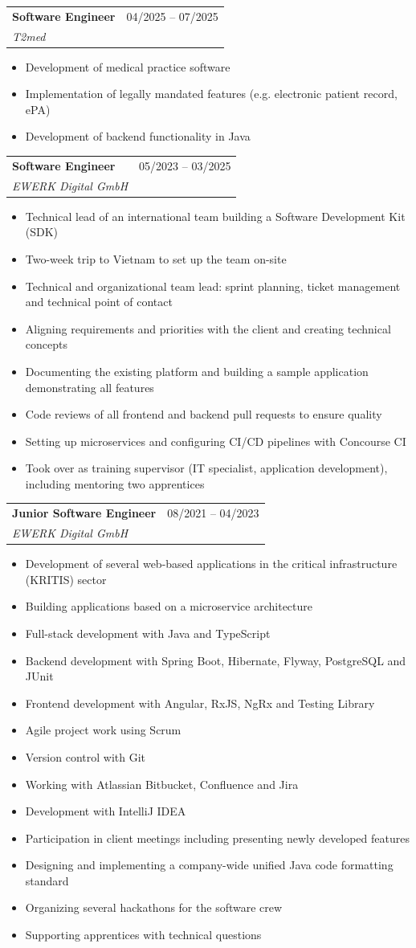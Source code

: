 \documentclass[a4paper,11pt]{article}
\makeatletter
\newcommand{\resumeItem}[1]{
  \item\small{
    {#1 \vspace{-2pt}}
  }
}
\newcommand{\resumeSubheading}[4]{
  \vspace{-2pt}\item
    \begin{tabular*}{0.97\textwidth}[t]{l@{\extracolsep{\fill}}r}
      \textbf{#1} & #2 \\
      \textit{\small#3} & \textit{\small #4} \\
    \end{tabular*}\vspace{-7pt}
}
\newcommand{\resumeItemListStart}{\begin{itemize}}
\newcommand{\resumeItemListEnd}{\end{itemize}\vspace{-5pt}}
\makeatother
\begin{document}
    \resumeSubheading
      {Software Engineer}{04/2025 -- 07/2025}
      {T2med}{}
      \resumeItemListStart
        \resumeItem{Development of medical practice software}
        \resumeItem{Implementation of legally mandated features (e.g. electronic patient record, ePA)}
        \resumeItem{Development of backend functionality in Java}
      \resumeItemListEnd

    \resumeSubheading
      {Software Engineer}{05/2023 -- 03/2025}
      {EWERK Digital GmbH}{}
      \resumeItemListStart
        \resumeItem{Technical lead of an international team building a Software Development Kit (SDK)}
        \resumeItem{Two-week trip to Vietnam to set up the team on-site}
        \resumeItem{Technical and organizational team lead: sprint planning, ticket management and technical point of contact}
        \resumeItem{Aligning requirements and priorities with the client and creating technical concepts}
        \resumeItem{Documenting the existing platform and building a sample application demonstrating all features}
        \resumeItem{Code reviews of all frontend and backend pull requests to ensure quality}
        \resumeItem{Setting up microservices and configuring CI/CD pipelines with Concourse CI}
        \resumeItem{Took over as training supervisor (IT specialist, application development), including mentoring two apprentices}
      \resumeItemListEnd

    \resumeSubheading
      {Junior Software Engineer}{08/2021 -- 04/2023}
      {EWERK Digital GmbH}{}
      \resumeItemListStart
        \resumeItem{Development of several web-based applications in the critical infrastructure (KRITIS) sector}
        \resumeItem{Building applications based on a microservice architecture}
        \resumeItem{Full-stack development with Java and TypeScript}
        \resumeItem{Backend development with Spring Boot, Hibernate, Flyway, PostgreSQL and JUnit}
        \resumeItem{Frontend development with Angular, RxJS, NgRx and Testing Library}
        \resumeItem{Agile project work using Scrum}
        \resumeItem{Version control with Git}
        \resumeItem{Working with Atlassian Bitbucket, Confluence and Jira}
        \resumeItem{Development with IntelliJ IDEA}
        \resumeItem{Participation in client meetings including presenting newly developed features}
        \resumeItem{Designing and implementing a company-wide unified Java code formatting standard}
        \resumeItem{Organizing several hackathons for the software crew}
        \resumeItem{Supporting apprentices with technical questions}
      \resumeItemListEnd
\end{document}
